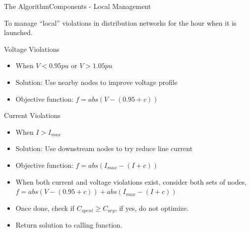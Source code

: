\documentclass[xcolor=svgnames,aspectratio=32,8pt]{beamer}
\begin{document}
\begin{frame}
  {The Algorithm}{Components - Local Management}

   To manage ``local'' violations in distribution networks for the hour when it is launched.\\
   \vspace{0.2cm}
   \begin{minipage}[!h]{0.45\paperwidth}
    \begin{block}{Voltage Violations}
      \begin{itemize}
        \item When $V<0.95pu$ or $V>1.05pu$
        \item Solution: Use nearby nodes to improve voltage profile
        \item Objective function: $f=abs(V-(0.95+c))$
      \end{itemize}
    \end{block}
   \end{minipage}%
   \begin{minipage}[!h]{0.45\paperwidth}
   \centering
    \begin{alertblock}{Current Violations}
      \begin{itemize}
        \item When $I>I_{max}$
        \item Solution: Use downstream nodes to try reduce line current
        \item Objective function: $f=abs(I_{max}-(I+c))$
      \end{itemize}
    \end{alertblock}
   \end{minipage}

   \begin{itemize}
    \item When both current and voltage violations exist, consider both sets of nodes, $f=abs(V-(0.95+c))+abs(I_{max}-(I+c))$
    \item Once done, check if $C_{spent} \ge C_{org}$, if yes, do not optimize.
    \item Return solution to calling function.
   \end{itemize}
\end{frame}
\end{document}

